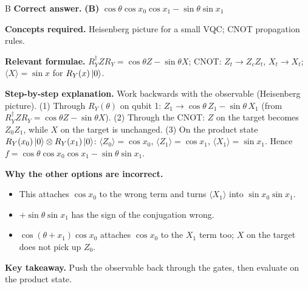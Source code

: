 \documentclass[11pt,a4paper]{article}
\newcommand{\qsep}{\par\vspace{2pt}{\color{black!15}\hrule}\vspace{4pt}}
\begin{document}
\begin{solbox}{B}
\textbf{\color{brand}Correct answer.} \textcolor{okgreen}{\textbf{(B)}} $\cos\theta\cos x_0\cos x_1 - \sin\theta\sin x_1$

\textbf{\color{brand}Concepts required.} Heisenberg picture for a small VQC; CNOT propagation rules.

\textbf{\color{brand}Relevant formulae.} $R_Y^\dagger ZR_Y = \cos\theta Z - \sin\theta X$; CNOT: $Z_t \to Z_cZ_t$, $X_t \to X_t$; $\langle X\rangle = \sin x$ for $R_Y(x)\ket0$.

\textbf{\color{brand}Step-by-step explanation.} Work backwards with the observable (Heisenberg picture). (1) Through $R_Y(\theta)$ on qubit 1:
$Z_1 \to \cos\theta\,Z_1 - \sin\theta\,X_1$ (from $R_Y^\dagger ZR_Y = \cos\theta Z - \sin\theta X$). (2) Through the CNOT: $Z$ on the target
becomes $Z_0Z_1$, while $X$ on the target is unchanged. (3) On the product state $R_Y(x_0)\ket0\otimes R_Y(x_1)\ket0$:
$\langle Z_0\rangle = \cos x_0$, $\langle Z_1\rangle = \cos x_1$, $\langle X_1\rangle = \sin x_1$.
Hence $f = \cos\theta\cos x_0\cos x_1 - \sin\theta\sin x_1$.

\textbf{\color{brand}Why the other options are incorrect.}
\begin{itemize}[leftmargin=2.4em, itemsep=1pt, topsep=2pt]
\item[\textbf{(A)}] This attaches $\cos x_0$ to the wrong term and turns $\langle X_1\rangle$ into $\sin x_0\sin x_1$.
\item[\textbf{(C)}] $+\sin\theta\sin x_1$ has the sign of the conjugation wrong.
\item[\textbf{(D)}] $\cos(\theta + x_1)\cos x_0$ attaches $\cos x_0$ to the $X_1$ term too; $X$ on the target does not pick up $Z_0$.
\end{itemize}
\textbf{\color{brand}Key takeaway.} Push the observable back through the gates, then evaluate on the product state.
\end{solbox}
\qsep
\end{document}
